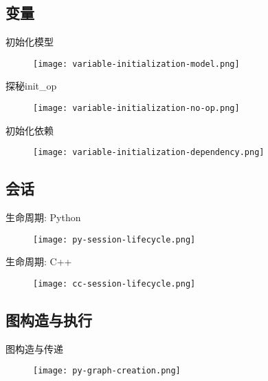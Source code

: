 \subsection{变量}

\begin{frame}{初始化模型}
  \begin{figure}
    \centering
    \texttt{[image: variable-initialization-model.png]}
  \end{figure}
\end{frame}

\begin{frame}{探秘init\_op}
  \begin{figure}
    \centering
    \texttt{[image: variable-initialization-no-op.png]}
  \end{figure}
\end{frame}

\begin{frame}{初始化依赖}
  \begin{figure}
    \centering
    \texttt{[image: variable-initialization-dependency.png]}
  \end{figure}
\end{frame}

\subsection{会话}

\begin{frame}{生命周期: Python}
  \begin{figure}
    \centering
    \texttt{[image: py-session-lifecycle.png]}
  \end{figure}
\end{frame}

\begin{frame}{生命周期: C++}
  \begin{figure}
    \centering
    \texttt{[image: cc-session-lifecycle.png]}
  \end{figure}
\end{frame}

\subsection{图构造与执行}

\begin{frame}{图构造与传递}
  \begin{figure}
    \centering
    \texttt{[image: py-graph-creation.png]}
  \end{figure}
\end{frame}

